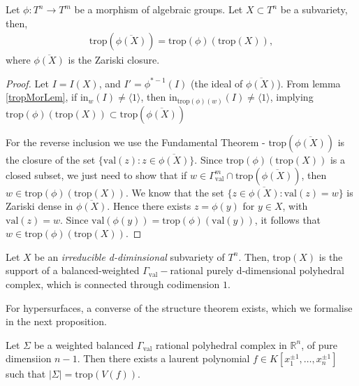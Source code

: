     \begin{corollary}
        \label{morphCor}
        Let $\phi: T^{n}\to T^{m}$ be a morphism of algebraic groups.
        Let $X\subset T^{n}$ be a subvariety, then,
        \begin{align*}
            \text{trop}(\overline{\phi(X)}) = \text{trop}(\phi)(\text{trop}(X)),
        \end{align*}
        where $\overline{\phi(X)}$ is the Zariski closure.
    \end{corollary}
    \begin{proof}
        Let $I = I(X)$, and $I' = \phi^{*-1}(I)$ (the ideal of $\overline{\phi(X)}$).
        From lemma \ref{tropMorLem}, if $\text{in}_{w}(I) \neq \langle 1 \rangle$, then $\text{in}_{\text{trop}(\phi)(w)}(I) \neq \langle 1 \rangle$, implying $\text{trop}(\phi)(\text{trop}(X)) \subset \text{trop}(\overline{\phi(X)})$
        \par For the reverse inclusion we use the Fundamental Theorem - 
        $\text{trop}(\overline{\phi(X)})$ is the closure of the set $\{ \text{val}(z): z \in \overline{\phi(X)}\}$.
        Since $\text{trop}(\phi)(\text{trop}(X))$ is a closed subset, we just need to show that if $w \in \Gamma_{\text{val}}^{m} \cap \text{trop}(\overline{\phi(X)})$, then $w \in \text{trop}(\phi)(\text{trop}(X))$.
        We know that the set $\{z \in \overline{\phi(X)}: \text{val}(z)=w\}$ is Zariski dense in $\overline{\phi(X)}$. 
        Hence there exists $z = \phi(y)$ for $y \in X$, with $\text{val}(z) = w$. 
        Since $\text{val}(\phi(y)) = \text{trop}(\phi)(\text{val}(y))$, it follows that $w \in \text{trop}(\phi)(\text{trop}(X))$.
    \end{proof}

    \begin{theorem}
        \label{StrucTh}
        Let $X$ be an \textit{irreducible d-diminsional} subvariety of $T^{n}$. Then, trop$(X)$ is the support of a balanced-weighted $\Gamma_{\text{val}}-$rational purely d-dimensional polyhedral complex, which is connected through codimension $1$.
    \end{theorem}
    For hypersurfaces, a converse of the structure theorem exists, which we formalise in the next proposition.

    \begin{proposition}
        \label{convStruc}
        Let $\Sigma$ be a weighted balanced $\Gamma_{\text{val}}$ rational polyhedral complex in $\mathbb{R}^{n}$, of pure dimensiion $n-1$. Then there exists a laurent polynomial $f \in  K[x_{1}^{\pm1}, \dots, x_{n}^{\pm1}]$ such that $|\Sigma|= \text{trop}(V(f))$.
    \end{proposition}

